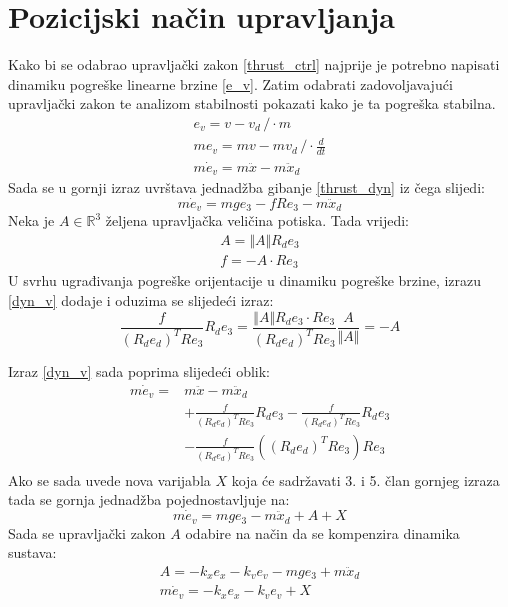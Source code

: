 \documentclass[times, utf8, diplomski]{fer}
\begin{document}
	\section{Pozicijski način upravljanja}
	Kako bi se odabrao upravljački zakon \ref{thrust_ctrl} najprije je potrebno napisati dinamiku pogreške linearne brzine \ref{e_v}. Zatim odabrati zadovoljavajući upravljački zakon te analizom stabilnosti pokazati kako je ta pogreška stabilna. 
	\begin{gather*}
		e_v = v - v_d \,/ \cdot m \\
		me_v = mv - mv_d \, / \cdot \frac{d}{dt} \\
		m\dot{e}_v = m \ddot{x} - m\ddot{x}_d
	\end{gather*}
	Sada se u gornji izraz uvrštava jednadžba gibanje \ref{thrust_dyn} iz čega slijedi:
	\begin{equation}
		m\dot{e}_v = mge_3 - fRe_3 - m\ddot{x}_d \label{dyn_v}
	\end{equation}
	Neka je $A\in\mathbb{R}^3$ željena upravljačka veličina potiska. Tada vrijedi:
	\begin{gather}
		A = \Vert A \Vert R_d e_3 \\
		f = - A \cdot Re_3
	\end{gather}
	U svrhu ugrađivanja pogreške orijentacije u dinamiku pogreške brzine, izrazu \ref{dyn_v} dodaje i oduzima se slijedeći izraz:
	\begin{equation}
		\frac{f}{(R_de_d)^TRe_3}R_d e_3 = \frac{\Vert A \Vert R_d e_3 \cdot Re_3}{(R_de_d)^TRe_3}\frac{A}{\Vert A \Vert} = - A
	\end{equation}
	
	Izraz \ref{dyn_v} sada poprima slijedeći oblik:
	\begin{align*}
		m\dot{e}_v =& m \ddot{x} - m\ddot{x}_d \\
		& + \frac{f}{(R_de_d)^TRe_3}R_d e_3 - \frac{f}{(R_de_d)^TRe_3}R_d e_3 \\
		& - \frac{f}{(R_de_d)^TRe_3}((R_de_d)^TRe_3)Re_3 \\
	\end{align*}
	Ako se sada uvede nova varijabla $X$ koja će sadržavati 3. i 5. član gornjeg izraza tada se gornja jednadžba pojednostavljuje na:
	\begin{equation*}
		m\dot{e}_v = mge_3 - m\ddot{x}_d + A + X
	\end{equation*}
	Sada se upravljački zakon $A$ odabire na način da se kompenzira dinamika sustava: 
	\begin{gather}
		A = -k_x e_x - k_ve_v - mge_3 + m\ddot{x}_d \\
		m\dot{e}_v = -k_x e_x - k_v e_v + X
	\end{gather}
	
\end{document}

